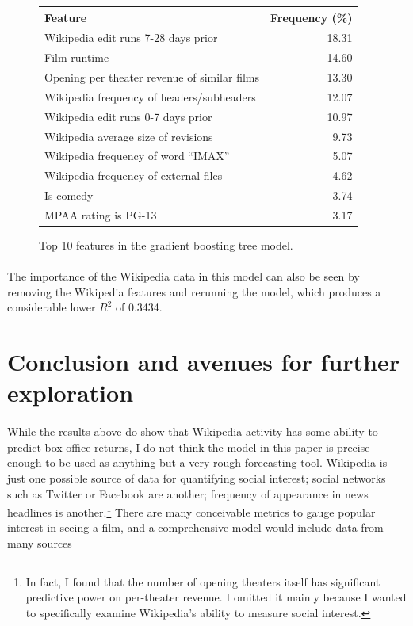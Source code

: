 \documentclass[10pt]{article}
\begin{document}
    \begin{figure}[ht]
        \vspace{0.25in}
        \centering
        \footnotesize
        \begin{tabular}{l|r}
            Feature & Frequency (\%) \\
            \hline
            Wikipedia edit runs 7-28 days prior & 18.31 \\
            Film runtime & 14.60 \\
            Opening per theater revenue of similar films & 13.30 \\
            Wikipedia frequency of headers/subheaders & 12.07 \\
            Wikipedia edit runs 0-7 days prior & 10.97 \\
            Wikipedia average size of revisions & 9.73 \\
            Wikipedia frequency of word ``IMAX'' & 5.07 \\
            Wikipedia frequency of external files & 4.62 \\
            Is comedy & 3.74 \\
            MPAA rating is PG-13 & 3.17 
        \end{tabular}
        \caption{Top 10 features in the gradient boosting tree model.}
        \label{fig:feature-importance}
    \end{figure}
    
    \paragraph{}
    The importance of the Wikipedia data in this model can also be seen by removing the Wikipedia features and rerunning the model, which produces a considerable lower $R^2$ of 0.3434. 
    
    \section{Conclusion and avenues for further exploration}
    
    \paragraph{}
    While the results above do show that Wikipedia activity has some ability to predict box office returns, I do not think the model in this paper is precise enough to be used as anything but a very rough forecasting tool. Wikipedia is just one possible source of data for quantifying social interest; social networks such as Twitter or Facebook are another; frequency of appearance in news headlines is another.\footnote{In fact, I found that the number of opening theaters itself has significant predictive power on per-theater revenue. I omitted it mainly because I wanted to specifically examine Wikipedia's ability to measure social interest.} There are many conceivable metrics to gauge popular interest in seeing a film, and a comprehensive model would include data from many sources
    
\end{document}
